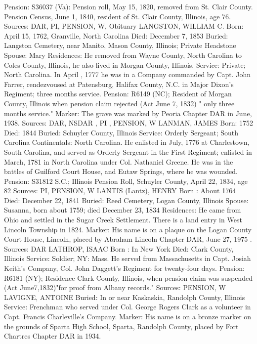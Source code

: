 Pension: S36037 (Va): Pension roll, May 15, 1820, removed from St. Clair County. Pension Census, June 1, 1840, resident of St. Clair County, Illinois, age 76.
Sources: DAR, PI, PENSION, W, Obituary 
LANGSTON, WILLIAM C. 
Born: April 15, 1762, Granville, North Carolina 
Died: December 7, 1853 
Buried: Langston Cemetery, near Manito, Mason County, Illinois; Private Head­stone
Spouse: Mary 
Residences: He removed from Wayne County, North Carolina to Coles County, Illinois, he also lived in Morgan County, Illinois. 
Service: Private; North Carolina. In April , 1777 he was in a Company commanded by Capt. John Farrer, rendezvoused at Patensburg, Halifax County, N.C. in Major Dixon's Regiment; three months service. 
Pension: R6149 (NC); Resident of Morgan County, Illinois when pension claim rejected (Act June 7, 1832) " only three months service."
Marker: The grave was marked by Peoria Chapter DAR in June, 1938. 
Sources: DAR, NSDAR , PI , PENSION, W 
LANMAN, JAMES
Born: 1752
Died: 1844
Buried: Schuyler County, Illinois 
Service: Orderly Sergeant; South Carolina Continentals: North Carolina. He enlisted in July, 1776 at Charlestown, South Carolina, and served as Orderly Sergeant in the First Regiment; enlisted in March, 1781 in North Carolina under Col. Nathaniel Greene. He was in the battles of Guilford Court House, and Eutaw Springs, where he was wounded. 
Pension: S31812 S.C.; Illinois Pension Roll, Schuyler County, April 22, 1834, age 82 
Sources: PI, PENSION, W 
LANTIS (Lantz), HENRY 
Born : About 1764 
Died: December 22, 1841 
Buried: Reed Cemetery, Logan County, Illinois 
Spouse: Susanna, born about 1759; died December 23, 1834 
Residences: He came from Ohio and settled in the Sugar Creek Settlement. There is a land entry in West Lincoln Township in 1824. 
Marker: His name is on a plaque on the Logan County Court House, Lincoln, placed by Abraham Lincoln Chapter DAR, June 27, 1975 . 
Sources: DAR 
LATHROP, ISAAC 
Born : In New York
Died: Clark County, Illinois
Service: Soldier; NY: Mass. He served from Massachusetts in Capt. Josiah Keith's Company, Col. John Daggett's Regiment for twenty-four days.
Pension: R6181 (NY); Residence Clark County, Illinois, when pension claim was suspended (Act June7,1832)"for proof from Albany records." Sources: PENSION, W 
LAVIGNE, ANTOINE
Buried: In or near Kaskaskia, Randolph County, Illinois
Service: Frenchman who served under Col. George Rogers Clark as a volunteer in Capt. Francis Charleville's Company.
Marker: His name is on a bronze marker on the grounds of Sparta High School, Sparta, Randolph  County, placed by Fort Chartres Chapter DAR in 1934.
